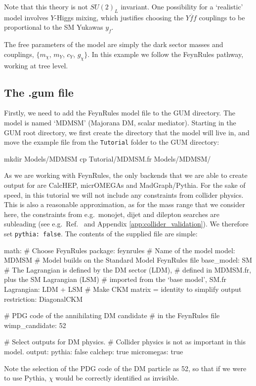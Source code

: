 \documentclass[pdftex,twocolumn,epjc3_preprint,runningheads]{svjour3}
\renewcommand{\_}{\discretionary{\underscore}{}{\underscore}}
\newcommand\term[1]{{\lstset{style=terminal}\lstinline!#1!\lstset{style=cpp}}}
\newcommand\guminline[1]{{{\lstset{style=gum}\lstinline!#1!}}}
\newcommand{\pythia}{\textsf{Pythia}\xspace}
\newcommand{\mo}{\micromegas}
\newcommand{\micromegas}{\textsf{micrOMEGAs}\xspace}
\newcommand{\gum}{\textsf{GUM}\xspace}
\newcommand{\dgum}{\!\!\term{.gum}\!\xspace}
\newcommand{\fr}{\textsf{FeynRules}\xspace}
\newcommand{\CH}{\textsf{CalcHEP}\xspace}
\newcommand{\MG}{\textsf{MadGraph}\xspace}
\begin{document}
Note that this theory is not $SU(2)_L$ invariant.  One possibility for a `realistic' model involves $Y$-Higgs mixing, which justifies choosing the  $Y\overline{f}f$ couplings to be proportional to the SM Yukawas $y_f$.

The free parameters of the model are simply the dark sector masses and couplings, $\{m_\chi$, $m_Y$, $c_Y$, $g_\chi\}$. In this example we follow the \fr pathway, working at tree level.

\subsection{The .gum file}

Firstly, we need to add the \fr model file to the \gum directory. The model is named `MDMSM' (Majorana DM, scalar mediator). Starting in the \gum root directory, we first create the directory that the model will live in, and move the example file from the \term{Tutorial} folder to the \gum directory:
%
\begin{lstterm}
mkdir Models/MDMSM
cp Tutorial/MDMSM.fr Models/MDMSM/
\end{lstterm}

As we are working with \fr, the only backends that we are able to create output for are \CH, \mo and \MG/\pythia. For the sake of speed, in this tutorial we will not include any constraints from collider physics.  This is also a reasonable approximation, as for the mass range that we consider here, the constraints from e.g.\ monojet, dijet and dilepton searches are subleading (see e.g.\ Ref.\ \cite{Buckley:2014fba} and Appendix \ref{app:collider_validation}).  We therefore set \guminline{pythia: false}. The contents of the supplied \dgum file are simple:
%
\begin{lstgum}
math:
  # Choose FeynRules
  package: feynrules
  # Name of the model
  model: MDMSM
  # Model builds on the Standard Model FeynRules file
  base_model: SM
  # The Lagrangian is defined by the DM sector (LDM),
  # defined in MDMSM.fr, plus the SM Lagrangian (LSM)
  # imported from the `base model', SM.fr
  Lagrangian: LDM + LSM
  # Make CKM matrix = identity to simplify output
  restriction: DiagonalCKM

# PDG code of the annihilating DM candidate
# in the FeynRules file
wimp_candidate: 52

# Select outputs for DM physics.
# Collider physics is not as important in this model.
output:
  pythia: false
  calchep: true
  micromegas: true
\end{lstgum}
Note the selection of the PDG code of the DM particle as 52, so that if we were to use \pythia, $\chi$ would be correctly identified as invisible.
\end{document}
